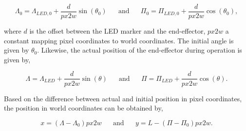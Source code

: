 \begin{equation}
    \Lambda_0 = \Lambda_{LED,0} + \frac{d}{px2w} \sin(\theta_0) \hspace{20pt} \text{and} \hspace{20pt} \Pi_0 = \Pi_{LED,0} + \frac{d}{px2w} \cos(\theta_0),
\end{equation}

where $d$ is the offset between the LED marker and the end-effector, $px2w$ a constant mapping pixel coordinates to world coordinates. The initial angle is given by $\theta_0$. Likewise, the actual position of the end-effector during operation is given by,


\begin{equation}
    \Lambda = \Lambda_{LED} + \frac{d}{px2w} \sin(\theta) \hspace{20pt} \text{and}  \hspace{20pt}  \Pi = \Pi_{LED} + \frac{d}{px2w} \cos(\theta).
\end{equation}

Based on the difference between actual and initial position in pixel coordinates, the position in world coordinates can be obtained by, 

\begin{equation}
    x = (\Lambda-\Lambda_0)px2w \hspace{20pt} \text{and} \hspace{20pt} y = L - (\Pi - \Pi_0)px2w. 
\end{equation}




